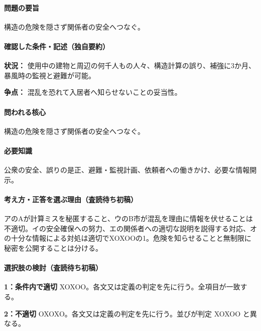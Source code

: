 \paragraph{問題の要旨} 構造の危険を隠さず関係者の安全へつなぐ。

\paragraph{確認した条件・記述（独自要約）}\mbox{}\par

\noindent\textbf{状況：} 使用中の建物と周辺の何千人もの人々、構造計算の誤り、補強に3か月、暴風時の監視と避難が可能。\par

\noindent\textbf{争点：} 混乱を恐れて入居者へ知らせないことの妥当性。\par

\paragraph{問われる核心} 構造の危険を隠さず関係者の安全へつなぐ。

\paragraph{必要知識} 公衆の安全、誤りの是正、避難・監視計画、依頼者への働きかけ、必要な情報開示。

\paragraph{考え方・正答を選ぶ理由（査読待ち初稿）} アのAが計算ミスを秘匿すること、ウのB市が混乱を理由に情報を伏せることは不適切。イの安全確保への努力、エの関係者への適切な説明を説得する対応、オの十分な情報による対処は適切でXOXOOの1。危険を知らせることと無制限に秘密を公開することは分ける。

\paragraph{選択肢の検討（査読待ち初稿）}\mbox{}\par

\noindent\textbf{1：条件内で適切} XOXOO。各文又は定義の判定を先に行う。全項目が一致する。\par

\noindent\textbf{2：不適切} OXOXO。各文又は定義の判定を先に行う。並びが判定 XOXOO と異なる。\par

